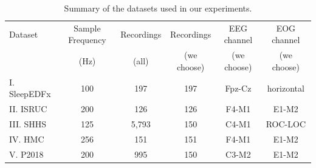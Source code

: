 \documentclass[letterpaper]{article} %
\begin{document}
	\begin{table}[tb]
		\centering
		\small
		\begin{tabular}{lccccc} 
			\toprule
			Dataset&Sample Frequency &Recordings&Recordings&EEG channel&EOG channel\\
			&(Hz)&(all)&(we choose)&(we choose)&(we choose)\\
			\midrule
			I. SleepEDFx&100&197&197&Fpz-Cz&horizontal\\
			II. ISRUC&200&126&126&F4-M1&E1-M2\\
			III. SHHS&125&5,793&150&C4-M1&ROC-LOC\\
			IV. HMC&256&151&151&F4-M1&E1-M2\\
			V. P2018&200&995&150&C3-M2&E1-M2\\
			\bottomrule
		\end{tabular}
		\caption{Summary of the datasets used in our experiments.}\label{tab:datasets}
	\end{table}
	
\end{document}
